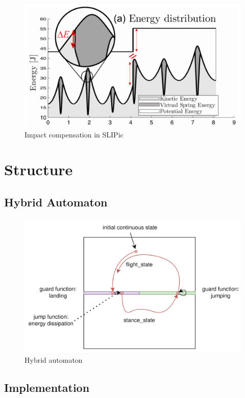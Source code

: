 \documentclass[10pt,conference]{IEEEtran}
\begin{document}
\begin{figure}[h]
   \centering
   \includegraphics[scale=0.15]{"assets/SLIPic.png"}
   \caption{Impact compensation in SLIPic \cite{Hutter2010}}
   \label{fig:SLIPic}
\end{figure}

\section{Structure}
\label{sec:Structure}
\subsection{Hybrid Automaton}

\begin{figure}[h]
   \centering
   \includegraphics[scale=0.17]{"assets/hybrid_automaton.png"}
   \caption{Hybrid automaton}
   \label{fig:hybrid_automaton}
\end{figure}

\subsection{Implementation}
\end{document}
